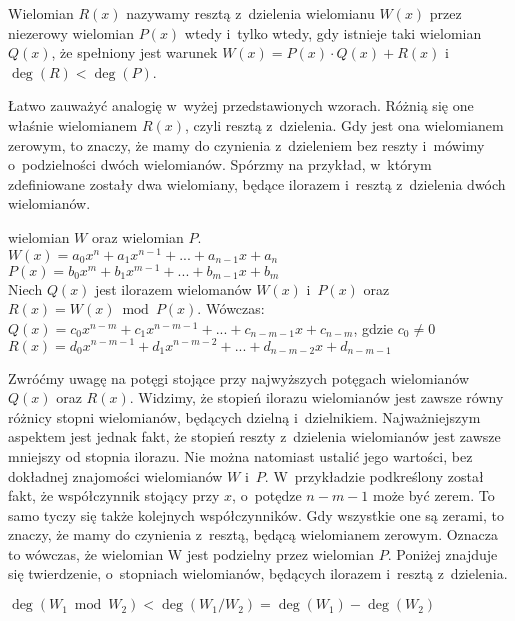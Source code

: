 \begin{definition}
	$ $\\
	Wielomian $R(x)$ nazywamy resztą z~dzielenia wielomianu $W(x)$ przez niezerowy wielomian $P(x)$ wtedy i~tylko wtedy, gdy istnieje taki wielomian $Q(x)$, że spełniony jest warunek $W(x) = P(x) \cdot Q(x) + R(x)$ i~$\deg(R) < \deg(P)$.
\end{definition}

Łatwo zauważyć analogię w~wyżej przedstawionych wzorach. Różnią się one właśnie wielomianem $R(x)$, czyli resztą z~dzielenia. Gdy jest ona wielomianem zerowym, to znaczy, że mamy do czynienia z~dzieleniem bez reszty i~mówimy o~podzielności dwóch wielomianów. Spórzmy na przykład, w~którym zdefiniowane zostały dwa wielomiany, będące ilorazem i~resztą z~dzielenia dwóch wielomianów.

\begin{example}
	$ $\\
	wielomian $W$ oraz wielomian $P$. \\
	$W(x) = a_0x^n + a_1x^{n-1} + ... + a_{n-1}x + a_n$ \\
	$P(x) = b_0x^m + b_1x^{m-1} + ... + b_{m-1}x + b_m$ \\
	Niech $Q(x)$ jest ilorazem wielomanów $W(x)$ i~$P(x)$ oraz $R(x) = W(x)\bmod P(x)$. Wówczas: \\
	$Q(x) = c_0x^{n-m} + c_1x^{n-m-1} + ... + c_{n-m-1}x + c_{n-m}$, gdzie $c_0\ne 0$ \\
	$R(x) = d_0x^{n-m-1} + d_1x^{n-m-2} + ... + d_{n-m-2}x + d_{n-m-1}$
\end{example}

Zwróćmy uwagę na potęgi stojące przy najwyższych potęgach wielomianów $Q(x)$ oraz $R(x)$. Widzimy, że stopień ilorazu wielomianów jest zawsze równy różnicy stopni wielomianów, będących dzielną i~dzielnikiem. Najważniejszym aspektem jest jednak fakt, że stopień reszty z~dzielenia wielomianów jest zawsze mniejszy od stopnia ilorazu. Nie można natomiast ustalić jego wartości, bez dokładnej znajomości wielomianów $W$ i~$P$. W~przykładzie podkreślony został fakt, że współczynnik stojący przy $x$, o~potędze $n-m-1$ może być zerem. To samo tyczy się także kolejnych współczynników. Gdy wszystkie one są zerami, to znaczy, że mamy do czynienia z~resztą, będącą wielomianem zerowym. Oznacza to wówczas, że wielomian W jest podzielny przez wielomian $P$. Poniżej znajduje się twierdzenie, o~stopniach wielomianów, będących ilorazem i~resztą z~dzielenia.

\begin{theorem}
	$ $\\
	$\deg(W_1 \bmod W_2) < \deg(W_1 / W_2) = \deg(W_1) - \deg(W_2)$
\end{theorem}

